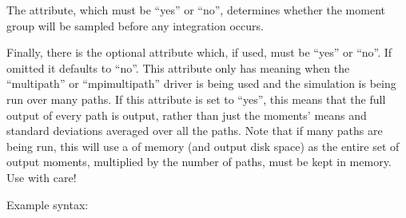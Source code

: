 \documentclass[letterpaper,10pt,english]{sphinxmanual}
\begin{document}
\sphinxAtStartPar
The  attribute, which must be “yes” or “no”, determines whether the moment group will be sampled before any integration occurs.

\sphinxAtStartPar
Finally, there is the optional  attribute which, if used, must be “yes” or “no”. If omitted it defaults to “no”. This attribute only has meaning when the “multi\sphinxhyphen{}path” or “mpi\sphinxhyphen{}multi\sphinxhyphen{}path” driver is being used and the simulation is being run over many paths. If this attribute is set to “yes”, this means that the full output of every path is output, rather than just the moments’ means and standard deviations averaged over all the paths. Note that if many paths are being run, this will use a  of memory (and output disk space) as the entire set of output moments, multiplied by the number of paths, must be kept in memory. Use with care!

\sphinxAtStartPar
Example syntax:
\end{document}

